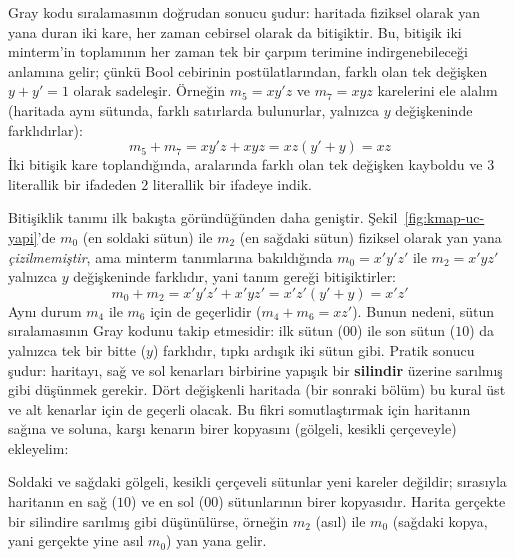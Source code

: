 Gray kodu sıralamasının doğrudan sonucu şudur: haritada fiziksel olarak yan yana duran
iki kare, her zaman cebirsel olarak da bitişiktir. Bu, bitişik iki minterm'in toplamının
her zaman tek bir çarpım terimine indirgenebileceği anlamına gelir; çünkü Bool
cebirinin postülatlarından, farklı olan tek değişken $y+y'=1$ olarak sadeleşir. Örneğin
$m_5=xy'z$ ve $m_7=xyz$ karelerini ele alalım (haritada aynı sütunda, farklı satırlarda
bulunurlar, yalnızca $y$ değişkeninde farklıdırlar):
\[
m_5+m_7 = xy'z+xyz = xz(y'+y) = xz
\]
İki bitişik kare toplandığında, aralarında farklı olan tek değişken kayboldu ve $3$
literallik bir ifadeden $2$ literallik bir ifadeye indik.

\begin{bilginot}
Bitişiklik tanımı ilk bakışta göründüğünden daha geniştir. Şekil~\ref{fig:kmap-uc-yapi}'de
$m_0$ (en soldaki sütun) ile $m_2$ (en sağdaki sütun) fiziksel olarak yan yana
\emph{çizilmemiştir}, ama minterm tanımlarına bakıldığında $m_0=x'y'z'$ ile $m_2=x'yz'$
yalnızca $y$ değişkeninde farklıdır, yani tanım gereği bitişiktirler:
\[
m_0+m_2 = x'y'z'+x'yz' = x'z'(y'+y) = x'z'
\]
Aynı durum $m_4$ ile $m_6$ için de geçerlidir ($m_4+m_6=xz'$). Bunun nedeni, sütun
sıralamasının Gray kodunu takip etmesidir: ilk sütun ($00$) ile son sütun ($10$) da
yalnızca tek bir bitte ($y$) farklıdır, tıpkı ardışık iki sütun gibi. Pratik sonucu
şudur: haritayı, sağ ve sol kenarları birbirine yapışık bir \textbf{silindir} üzerine
sarılmış gibi düşünmek gerekir. Dört değişkenli haritada (bir sonraki bölüm) bu kural üst
ve alt kenarlar için de geçerli olacak. Bu fikri somutlaştırmak için haritanın sağına ve
soluna, karşı kenarın birer kopyasını (gölgeli, kesikli çerçeveyle) ekleyelim:

\begin{center}
\label{fig:kmap-silindir}
\end{center}
Soldaki ve sağdaki gölgeli, kesikli çerçeveli sütunlar yeni kareler değildir; sırasıyla
haritanın en sağ ($10$) ve en sol ($00$) sütunlarının birer kopyasıdır. Harita gerçekte
bir silindire sarılmış gibi düşünülürse, örneğin $m_2$ (asıl) ile $m_0$ (sağdaki kopya,
yani gerçekte yine asıl $m_0$) yan yana gelir.
\end{bilginot}

